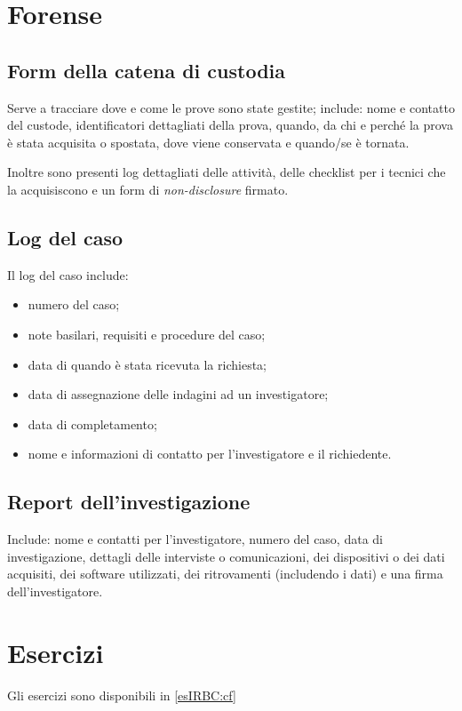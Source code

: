 \section{Forense}

\subsection{Form della catena di custodia}

Serve a tracciare dove e come le prove sono state gestite; include:
nome e contatto del custode, identificatori dettagliati della prova, quando,
da chi e perché la prova è stata acquisita o spostata, dove viene conservata
e quando/se è tornata.

Inoltre sono presenti log dettagliati delle attività, delle checklist per i
tecnici che la acquisiscono e un form di \textit{non-disclosure} firmato.

\subsection{Log del caso}

Il log del caso include:
\begin{itemize}
\item numero del caso;
\item note basilari, requisiti e procedure del caso;
\item data di quando è stata ricevuta la richiesta;
\item data di assegnazione delle indagini ad un investigatore;
\item data di completamento;
\item nome e informazioni di contatto per l'investigatore e il richiedente.
\end{itemize}

\subsection{Report dell'investigazione}

Include: nome e contatti per l'investigatore, numero del caso, data di
investigazione, dettagli delle interviste o comunicazioni, dei
dispositivi o dei dati acquisiti, dei software utilizzati, dei ritrovamenti
(includendo i dati) e una firma dell'investigatore.

\section{Esercizi}

Gli esercizi sono disponibili in \ref{esIRBC:cf}
